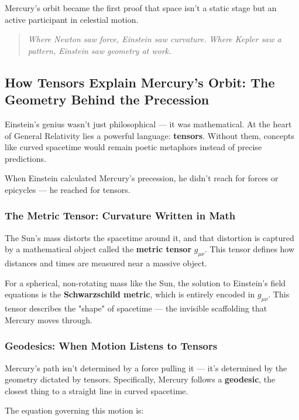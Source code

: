 Mercury’s orbit became the first proof that space isn’t a static stage but an active participant in celestial motion.

\begin{quote}
\textit{Where Newton saw force, Einstein saw curvature.  
Where Kepler saw a pattern, Einstein saw geometry at work.}
\end{quote}

\subsection{How Tensors Explain Mercury’s Orbit: The Geometry Behind the Precession}

Einstein’s genius wasn’t just philosophical — it was mathematical. At the heart of General Relativity lies a powerful language: \textbf{tensors}. Without them, concepts like curved spacetime would remain poetic metaphors instead of precise predictions.

When Einstein calculated Mercury’s precession, he didn’t reach for forces or epicycles — he reached for tensors.

\subsubsection*{The Metric Tensor: Curvature Written in Math}

The Sun’s mass distorts the spacetime around it, and that distortion is captured by a mathematical object called the \textbf{metric tensor} \( g_{\mu\nu} \). This tensor defines how distances and times are measured near a massive object.

For a spherical, non-rotating mass like the Sun, the solution to Einstein’s field equations is the \textbf{Schwarzschild metric}, which is entirely encoded in \( g_{\mu\nu} \). This tensor describes the "shape" of spacetime — the invisible scaffolding that Mercury moves through.

\subsubsection*{Geodesics: When Motion Listens to Tensors}

Mercury’s path isn’t determined by a force pulling it — it’s determined by the geometry dictated by tensors. Specifically, Mercury follows a \textbf{geodesic}, the closest thing to a straight line in curved spacetime.

The equation governing this motion is:

